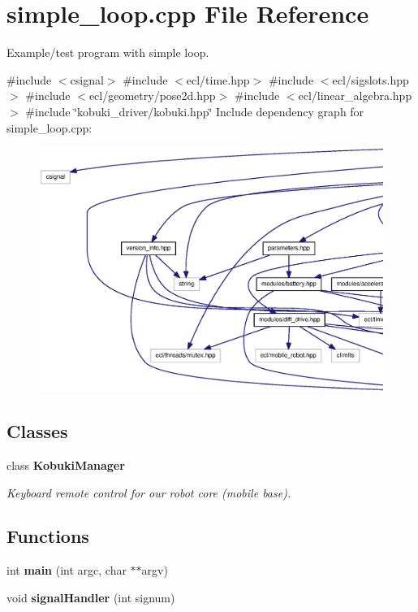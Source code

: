 \section{simple\-\_\-loop.\-cpp \-File \-Reference}
\label{simple__loop_8cpp}


\-Example/test program with simple loop.  


{\ttfamily \#include $<$csignal$>$}\*
{\ttfamily \#include $<$ecl/time.\-hpp$>$}\*
{\ttfamily \#include $<$ecl/sigslots.\-hpp$>$}\*
{\ttfamily \#include $<$ecl/geometry/pose2d.\-hpp$>$}\*
{\ttfamily \#include $<$ecl/linear\-\_\-algebra.\-hpp$>$}\*
{\ttfamily \#include \char`\"{}kobuki\-\_\-driver/kobuki.\-hpp\char`\"{}}\*
\-Include dependency graph for simple\-\_\-loop.\-cpp\-:
\nopagebreak
\begin{figure}[H]
\begin{center}
\leavevmode
\includegraphics[width=350pt]{simple__loop_8cpp__incl}
\end{center}
\end{figure}
\subsection*{\-Classes}
\begin{DoxyCompactItemize}
\item 
class {\bf \-Kobuki\-Manager}
\begin{DoxyCompactList}\small\item\em \-Keyboard remote control for our robot core (mobile base). \end{DoxyCompactList}\end{DoxyCompactItemize}
\subsection*{\-Functions}
\begin{DoxyCompactItemize}
\item 
int {\bf main} (int argc, char $\ast$$\ast$argv)
\item 
void {\bf signal\-Handler} (int signum)
\end{DoxyCompactItemize}
